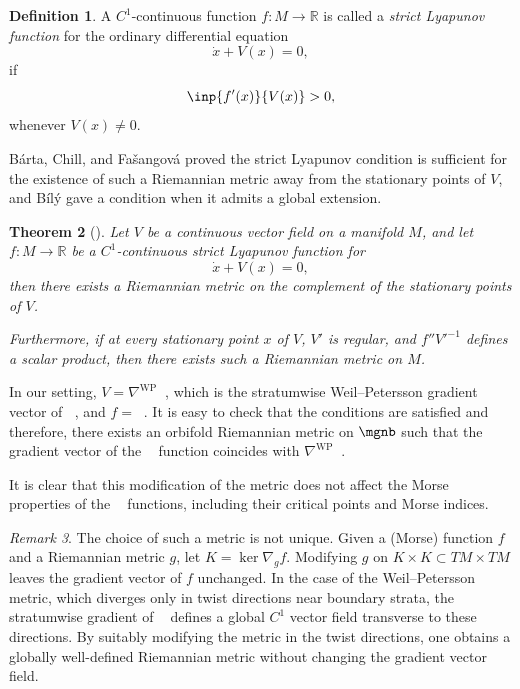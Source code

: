 \documentclass[12pt]{amsart}
\newtheorem{theorem}{Theorem}[section]
\theoremstyle{remark}
\newtheorem{remark}[theorem]{Remark}
\theoremstyle{definition}
\newtheorem{definition}[theorem]{Definition}
\DeclareMathOperator{\syst}{sys_T}
\numberwithin{equation}{section}
\begin{document}
\begin{definition}
    A $C^1$-continuous function $f\colon M\to\mathbb R$ is called a \emph{strict Lyapunov function} for the ordinary differential equation
    \[
    \dot{x} + V(x) = 0,
    \]
    if
    \[
    \inp{f'(x)}{V(x)}>0,
    \]
    whenever $V(x)\neq0$.
\end{definition}

Bárta, Chill, and Fašangová \cite{barta2012every} proved the strict Lyapunov condition is sufficient for the existence of such a Riemannian metric away from the stationary points of $V$, and Bílý \cite{bily2014transformations} gave a condition when it admits a global extension.

\begin{theorem}[\cite{barta2012every,bily2014transformations}]
    Let $V$ be a continuous vector field on a manifold $M$, and let $f\colon M\to \mathbb R$ be a $C^1$-continuous strict Lyapunov function for
    \[
    \dot{x} + V(x) = 0,
    \]
    then there exists a Riemannian metric on the complement of the stationary points of $V$.

    Furthermore, if at every stationary point $x$ of $V$, $V'$ is regular, and $f''V'^{-1}$ defines a scalar product, then there exists such a Riemannian metric on $M$.
\end{theorem}

In our setting, $V=\nabla^\text{WP}\syst$, which is the stratumwise Weil--Petersson gradient vector of $\syst$, and $f=\syst$. It is easy to check that the conditions are satisfied and therefore, there exists an orbifold Riemannian metric on $\mgnb$ such that the gradient vector of the $\syst$ function coincides with $\nabla^\text{WP}\syst$.

It is clear that this modification of the metric does not affect the Morse properties of the $\syst$ functions, including their critical points and Morse indices.


\begin{remark}

    The choice of such a metric is not unique. Given a (Morse) function $f$ and a Riemannian metric $g$, let $K=\ker \nabla_g f$. Modifying $g$ on $K\times K \subset TM \times TM$ leaves the gradient vector of $f$ unchanged. In the case of the Weil--Petersson metric, which diverges only in twist directions near boundary strata, the stratumwise gradient of $\syst$ defines a global $C^1$ vector field transverse to these directions. By suitably modifying the metric in the twist directions, one obtains a globally well-defined Riemannian metric without changing the gradient vector field.
\end{remark}
\end{document}
